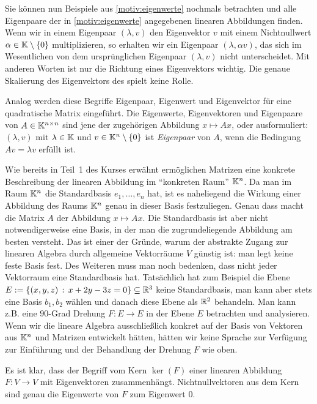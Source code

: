 Sie können nun Beispiele aus \ref{motiv:eigenwerte} nochmals betrachten und alle Eigenpaare der in \ref{motiv:eigenwerte} angegebenen linearen Abbildungen finden. Wenn wir in einem Eigenpaar $(\lambda,v)$ den Eigenvektor $v$ mit einem Nichtnullwert $\alpha \in \mathbb K \setminus \{0\}$ multiplizieren, so erhalten wir ein Eigenpaar $(\lambda, \alpha v)$, das sich im Wesentlichen von dem ursprünglichen Eigenpaar $(\lambda,v)$ nicht unterscheidet. Mit anderen Worten ist nur die Richtung eines Eigenvektors wichtig. Die genaue Skalierung des Eigenvektors des spielt keine Rolle. 

Analog werden diese Begriffe Eigenpaar, Eigenwert und Eigenvektor für eine quadratische Matrix eingeführt. Die Eigenwerte, Eigenvektoren und Eigenpaare von $ A \in \mathbb K^{n \times n} $ sind jene der zugehörigen Abbildung $ x \mapsto Ax $, oder ausformuliert: $(\lambda,v)$ mit $\lambda \in \mathbb K$ und $v \in \mathbb K^n \setminus \{0\}$ ist \emph{Eigenpaar} von $A$, wenn die Bedingung $A v = \lambda v$ erfüllt ist. 

\begin{bem}
Wie bereits in Teil~1 des Kurses erwähnt ermöglichen Matrizen eine konkrete Beschreibung der linearen Abbildung im ``konkreten Raum'' $\mathbb K^n$. Da man im Raum $\mathbb K^n$ die Standardbasis $e_1,\ldots,e_n$ hat, ist es naheliegend die Wirkung einer Abbildung des Raums $\mathbb K^n$ genau in dieser Basis festzuliegen. Genau dass macht die Matrix $A$ der Abbildung $x \mapsto A x$. Die Standardbasis ist aber nicht notwendigerweise eine Basis, in der man die zugrundeliegende Abbildung am besten versteht. Das ist einer der Gründe, warum der abstrakte Zugang zur linearen Algebra durch allgemeine Vektorräume $V$ günstig ist: man legt keine feste Basis fest. Des Weiteren muss man noch bedenken, dass nicht jeder Vektorraum eine Standardbasis hat. Tatsächlich hat zum Beispiel die Ebene $ E:= \{ (x,y,z) \, :\, x + 2 y - 3 z = 0 \} \subseteq \mathbb R^3$ keine Standardbasis, man kann aber stets eine Basis $b_1, b_2$ wählen und danach diese Ebene als $\mathbb R^2$ behandeln. Man kann z.B. eine $90$-Grad Drehung $ F: E \to E$ in der Ebene $E$ betrachten und analysieren. Wenn wir die lineare Algebra ausschließlich konkret auf der Basis von Vektoren aus $\mathbb K^n$ und Matrizen entwickelt hätten, hätten wir keine Sprache zur Verfügung zur Einführung und der Behandlung der Drehung $F$ wie oben. 
\end{bem}

\begin{bem}
	Es ist klar, dass der Begriff vom Kern
	$\ker(F)$ einer linearen Abbildung $F : V \to V$ mit Eigenvektoren zusammenhängt. Nichtnullvektoren aus dem Kern sind genau die Eigenwerte von $F$ zum Eigenwert $0$. 
\end{bem}

